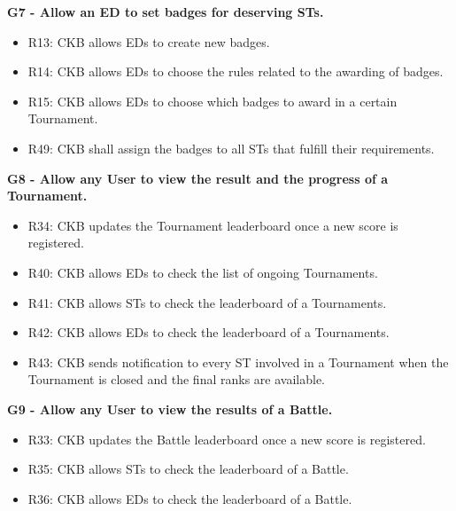 \vspace{1.5cm}
\textbf{G7 - Allow an ED to set badges for deserving STs.}
\begin{itemize}
    \item R13: CKB allows EDs to create new badges.
    \item R14: CKB allows EDs to choose the rules related to the awarding of badges.
    \item R15: CKB allows EDs to choose which badges to award in a certain Tournament.
    \item R49: CKB shall assign the badges to all STs that fulfill their requirements.
\end{itemize}


\vspace{1.5cm}
\textbf{G8 - Allow any User to view the result and the progress of a Tournament.}
\begin{itemize}
    \item R34: CKB updates the Tournament leaderboard once a new score is registered.
    \item R40: CKB allows EDs to check the list of ongoing Tournaments.
    \item R41: CKB allows STs to check the leaderboard of a Tournaments.
    \item R42: CKB allows EDs to check the leaderboard of a Tournaments.
    \item R43: CKB sends notification to every ST involved in a Tournament when the Tournament is closed and the final ranks are available.
\end{itemize}


\vspace{1.5cm}
\textbf{G9 - Allow any User to view the results of a Battle.}
\begin{itemize}
    \item R33: CKB updates the Battle leaderboard once a new score is registered.
    \item R35: CKB allows STs to check the leaderboard of a Battle.
    \item R36: CKB allows EDs to check the leaderboard of a Battle.
\end{itemize}



